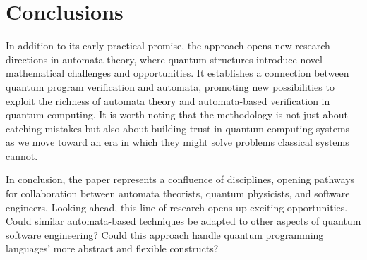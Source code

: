 \section{Conclusions}
In addition to its early practical promise,  the approach opens new research directions in automata theory, where quantum structures introduce novel mathematical challenges and opportunities.
%
It establishes a connection between quantum program verification and automata, promoting new possibilities to
exploit the richness of automata theory and automata-based verification in quantum computing.
%
It is worth noting that the methodology is not just about catching mistakes but also about building trust in quantum computing systems as we move toward an era in which they might solve problems classical systems cannot.


In conclusion, the  paper represents a confluence of disciplines, opening pathways for collaboration between automata theorists, quantum physicists, and software engineers. 
%
Looking ahead, this line of research opens up exciting opportunities. Could similar automata-based techniques be adapted to other aspects of quantum software engineering? Could this approach handle quantum programming languages' more abstract and flexible constructs? 

